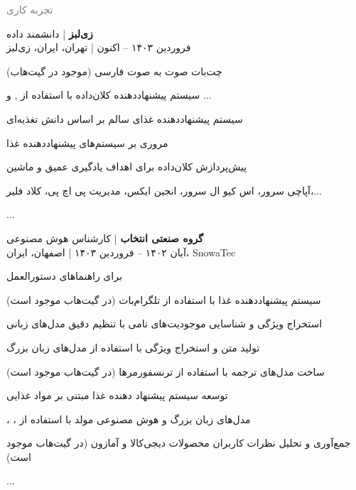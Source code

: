 \documentclass[a4paper]{deedy-persian} %
\begin{document}
\begin{minipage}[t]{0.62\textwidth} %


\setlength{\itemsep}{5pt} %
\setlength{\topsep}{10pt} %

\textcolor{gray}{\huge {تجربه کاری}}
\vspace{\topsep} %

\textbf{زی‌لبز} | دانشمند داده \\
\vspace{\itemsep} %
فروردین ۱۴۰۳ – اکنون | تهران، ایران، زی‌لبز
\vspace{\itemsep} %
\begin{RTL}
\begin{tightitemize}
\item چت‌بات صوت به صوت فارسی (موجود در گیت‌هاب)
\item سیستم پیشنهاددهنده کلان‌داده با استفاده از ,  و ...
\item سیستم پیشنهاد‌دهنده غذای سالم بر اساس دانش تغذیه‌ای
\item مروری بر سیستم‌های پیشنهاددهنده غذا
\item پیش‌پردازش کلان‌داده برای اهداف یادگیری عمیق و ماشین
\item آپاچی سرور، اس کیو ال سرور، انجین ایکس، مدیریت پی اچ پی، کلاد فلیر،...
\item ...
\end{tightitemize}
\end{RTL}
\vspace{\topsep} %

\textbf{گروه صنعتی انتخاب} | کارشناس هوش مصنوعی \\
\vspace{\itemsep} %
آبان ۱۴۰۲ – فروردین ۱۴۰۳ | اصفهان، ایران، SnowaTec
\vspace{\itemsep} %
\begin{tightitemize}
\item {} برای راهنماهای دستورالعمل
\item سیستم پیشنهاددهنده غذا با استفاده از تلگرام‌بات (در گیت‌هاب موجود است)
\item استخراج ویژگی و شناسایی موجودیت‌های نامی با تنظیم دقیق مدل‌های زبانی
\item تولید متن و استخراج ویژگی با استفاده از مدل‌های زبان بزرگ
\item ساخت مدل‌های ترجمه با استفاده از ترنسفورمرها (در گیت‌هاب موجود است)
\item توسعه سیستم پیشنهاد دهنده غذا مبتنی بر مواد غذایی 
\item {}، ، مدل‌های زبان بزرگ و هوش مصنوعی مولد با استفاده از 
\item جمع‌آوری و تحلیل نظرات کاربران محصولات دیجی‌کالا و آمازون (در گیت‌هاب موجود است)
\item ...
\end{tightitemize}
\vspace{\topsep} %


\end{minipage}
\end{document}
